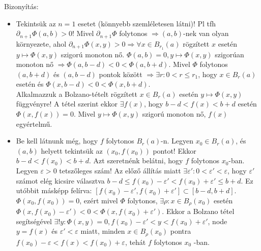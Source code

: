 \documentclass[12pt,a4paper]{scrartcl}
\providecommand{\tightlist}{%
  \setlength{\itemsep}{0pt}\setlength{\parskip}{0pt}}
\newenvironment{bizonyitas}{}{}
\begin{document}
\begin{bizonyitas}

Bizonyítás:

\begin{itemize}
\tightlist
\item
  Tekintsük az \(n = 1\) esetet (könnyebb szemléletesen látni)! Pl tfh
  \(\partial_{n + 1}\Phi\left( {a,b} \right) > 0\)! Mivel
  \(\partial_{n + 1}\Phi\) folytonos
  \(\left. \Rightarrow\left( {a,b} \right) \right.\)-nek van olyan
  környezete, ahol
  \(\left. \partial_{n + 1}\Phi\left( {x,y} \right) > 0\Rightarrow\forall x \in B_{r_{1}}\left( a \right) \right.\)
  rögzített \(x\) esetén
  \(\left. y\mapsto\Phi\left( {x,y} \right) \right.\) szigorú monoton
  nő.
  \(\left. \Phi\left( {a,b} \right) = 0,y\mapsto\Phi\left( {x,y} \right) \right.\)
  szigorúan monoton nő
  \(\left. \Rightarrow\Phi\left( {a,b - d} \right) < 0 < \Phi\left( {a,b + d} \right) \right.\).
  Mivel \(\Phi\) folytonos \(\left( {a,b + d} \right)\) és
  \(\left( {a,b - d} \right)\) pontok között
  \(\left. \Rightarrow\exists r:0 < r \leq r_{1} \right.\), hogy
  \(x \in B_{r}\left( a \right)\) esetén és
  \(\Phi\left( {x,b - d} \right) < 0 < \Phi\left( {x,b + d} \right)\).\\
  Alkalmazzuk a Bolzano-tételt rögzített \(x \in B_{r}\left( a \right)\)
  esetén \(\left. y\mapsto\Phi\left( {x,y} \right) \right.\) függvényre!
  A tétel szerint ekkor \(\exists f\left( x \right)\), hogy
  \(b - d < f\left( x \right) < b + d\) esetén
  \(\Phi\left( {x,f\left( x \right)} \right) = 0\). Mivel
  \(\left. y\mapsto\Phi\left( {x,y} \right) \right.\) szigorú monoton
  nő, \(f\left( x \right)\) egyértelmű.
\item
  Be kell látnunk még, hogy \(f\) folytonos \(B_{r}\left( a \right)\)-n.
  Legyen \(x_{0} \in B_{r}\left( a \right)\), és
  \(\left( {a,b} \right)\) helyett tekintsük az
  \(\left( {x_{0},f\left( x_{0} \right)} \right)\) pontot! Ekkor
  \(b - d < f\left( x_{0} \right) < b + d\). Azt szeretnénk belátni,
  hogy \(f\) folytonos \(x_{0}\)-ban. Legyen \(\varepsilon > 0\)
  tetszőleges szám! Az előző állítás miatt
  \(\exists\varepsilon':0 < \varepsilon' < \varepsilon\), hogy
  \(\varepsilon'\) számot elég kicsire választva
  \(b - d \leq f\left( x_{0} \right) - \varepsilon' < f\left( x_{0} \right) + \varepsilon' \leq b + d\).
  Ez utóbbit másképp felírva:
  \(\left\lbrack {f\left( x_{0} \right) - \varepsilon',f\left( x_{0} \right) + \varepsilon'} \right\rbrack \subset \left\lbrack {b - d,b + d} \right\rbrack\).
  \(\Phi\left( {x_{0},f\left( x_{0} \right)} \right) = 0\), ezért mivel
  \(\Phi\) folytonos, \(\exists\rho:x \in B_{\rho}\left( x_{0} \right)\)
  esetén
  \(\Phi\left( {x,f\left( x_{0} \right) - \varepsilon'} \right) < 0 < \Phi\left( {x,f\left( x_{0} \right) + \varepsilon'} \right)\).
  Ekkor a Bolzano tétel segítségével
  \(\exists!y:\Phi\left( {x,y} \right) = 0,f\left( x_{0} \right) - \varepsilon' < y < f\left( x_{0} \right) + \varepsilon'\),
  node \(y = f\left( x \right)\) és \(\varepsilon' < \varepsilon\)
  miatt, minden \(x \in B_{\rho}\left( x_{0} \right)\) pontra
  \(f\left( x_{0} \right) - \varepsilon < f\left( x \right) < f\left( x_{0} \right) + \varepsilon\),
  tehát \(f\) folytonos \(x_{0}\) -ban.
\end{itemize}


\end{bizonyitas}
\end{document}
